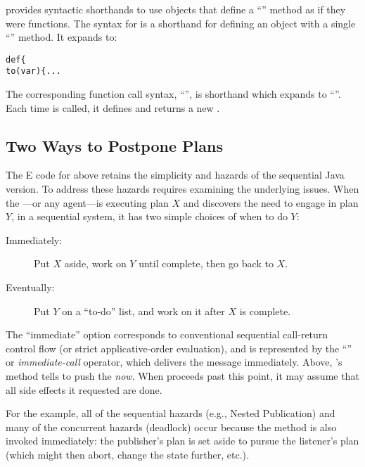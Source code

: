 \documentclass{llncs}
\begin{document}
 provides syntactic shorthands to use objects that define a
``'' method as if they were functions. The syntax for
 is a shorthand for defining an object with a
single ``'' method. It expands to:
%
\begin{alltt}
    def  \{
        to (var ) \{ ...
\end{alltt}
%
The corresponding function call syntax,
``'', is shorthand which expands to
``''. Each time  is
called, it defines and returns a new .

\subsection{Two Ways to Postpone Plans}

The E code for  above retains the simplicity and
hazards of the sequential Java version.  To address these hazards
requires examining the underlying issues.  When the
---or any agent---is executing plan $X$ and
discovers the need to engage in plan $Y$, in a sequential system, it
has two simple choices of when to do $Y$:
%
\begin{description}

\item[Immediately:] Put $X$ aside, work on $Y$ until
complete, then go back to $X$.

\item[Eventually:] Put $Y$ on a ``to-do'' list, and work on it after
$X$ is complete.

\end{description}
%
The ``immediate'' option corresponds to conventional sequential
call-return control flow (or strict applicative-order evaluation), and
is represented by the ``'' or \emph{immediate-call} operator,
which delivers the message immediately. Above, 's
 method tells  to push the
 \emph{now}. When  proceeds past
this point, it may assume that all side effects it requested are done.

For the  example, all of the sequential hazards
(e.g., Nested Publication) and many of the concurrent hazards
(deadlock) occur because the  method is also
invoked immediately: the publisher's plan is set aside to pursue the
listener's plan (which might then abort, change the state further,
etc.).
\end{document}
